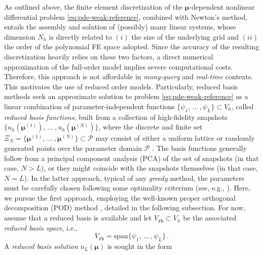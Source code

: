 \documentclass[longtitle]{elsarticle}
\numberwithin{equation}{section}
\theoremstyle{theorem}
\theoremstyle{definition}
\theoremstyle{remark}
\theoremstyle{proposition}
\numberwithin{figure}{section}
\newcommand{\bg}[1]{\boldsymbol{#1}}
\begin{document}
		As outlined above, the finite element discretization of the $\bg{\mu}$-dependent nonlinear differential problem \eqref{eq:pde-weak-reference}, combined with Newton's method, entails the assembly and solution of (possibly) many linear systems, whose dimension $N_h$ is directly related to $(i)$ the size of the underlying grid and $(ii)$ the order of the polynomial FE space adopted. Since the accuracy of the resulting discretization heavily relies on these two factors, a direct numerical approximation of the full-order model implies severe computational costs. Therefore, this approach is not affordable in \emph{many-query} and \emph{real-time} contexts. This motivates the use of reduced order models. Particularly, reduced basis methods seek an approximate solution to problem \eqref{eq:pde-weak-reference} as a linear combination of parameter-independent functions $\big\lbrace \psi_1, \, \ldots \, , \psi_L \big\rbrace \subset V_h$, called \emph{reduced basis functions}, built from a collection of high-fidelity snapshots $\big\lbrace u_h \left( \bg{\mu}^{(1)} \right), \, \ldots \, , u_h \left( \bg{\mu}^{(N)} \right) \big\rbrace$, where the discrete and finite set $\Xi_N = \big\lbrace \bg{\mu}^{(1)}, \, \ldots \, , \bg{\mu}^{(N)} \big\rbrace \subset \mathcal{P}$ may consist of either a uniform lattice or randomly generated points over the parameter domain $\mathcal{P}$ \cite{HSR16}. The basis functions  generally follow from a principal component analysis (PCA) of the set of snapshots (in that case, $N > L$), or they might coincide with the snapshots themselves (in that case, $N = L$). In the latter approach, typical of any \emph{greedy} method, the parameters \smash{$\big\lbrace \bg{\mu}^{(n)} \big\rbrace_{1 \leq n \leq N}$} must be carefully chosen following some optimality criterium (see, e.g., \cite{Chen17}). Here, we pursue the first approach, employing the well-known proper orthogonal decomposition (POD) method \cite{Lia02, Vol08}, detailed in the following subsection. For now, assume that a reduced basis is available and let $V_{\texttt{rb}} \subset V_h$ be the associated \emph{reduced basis space}, i.e.,
		\begin{equation*}
			V_{\texttt{rb}} = \text{span} \big\lbrace \psi_1, \, \ldots \, , \psi_L \big\rbrace \, .
		\end{equation*}
		A \emph{reduced basis solution} $u_{L}(\bg{\mu})$ is sought in the form
\end{document}
